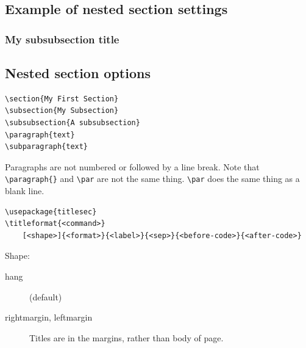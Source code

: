 \documentclass{article}
\begin{document}
\lipsum[1]
\subsection{Example of nested section settings}
\lipsum[2]
\subsubsection{My subsubsection title}
\lipsum[3]

\subsection{Nested section options}
\begin{minipage}[t]{0.5\textwidth}
\begin{lstlisting}
\section{My First Section}
\subsection{My Subsection}
\subsubsection{A subsubsection}
\paragraph{text}
\subparagraph{text}
\end{lstlisting}
\end{minipage}
\begin{minipage}[t]{0.5\textwidth}
Paragraphs are not numbered or followed by a line break.
Note that \verb|\paragraph{}| and \verb|\par| are not the same thing.
\verb|\par| does the same thing as a blank line.
\end{minipage}

\begin{lstlisting}
\usepackage{titlesec}
\titleformat{<command>}
    [<shape>]{<format>}{<label>}{<sep>}{<before-code>}{<after-code>}
\end{lstlisting}

Shape:
\begin{description}
    \item [hang] (default)
    \item [rightmargin, leftmargin] Titles are in the margins, rather than
        body of page.
\end{description}
\end{document}
